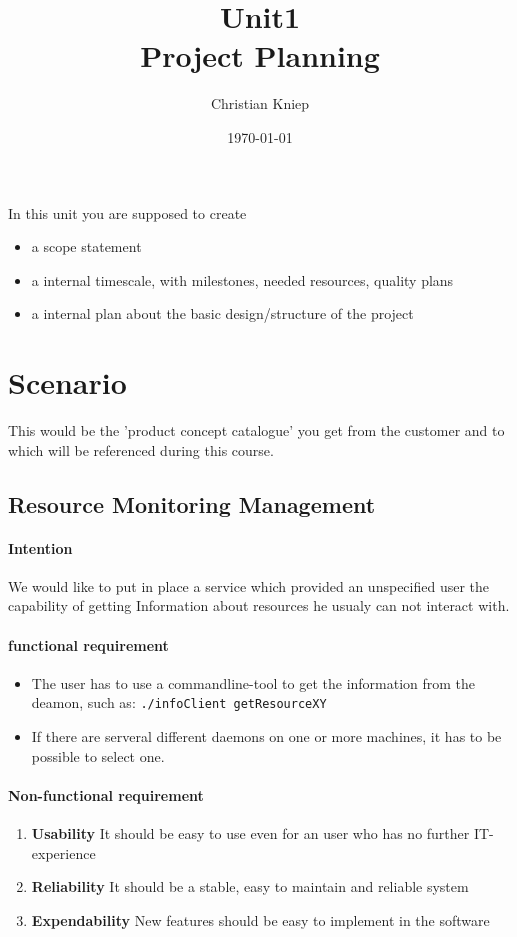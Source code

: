\documentclass[11pt]{article}
\author{Christian Kniep}
\title{Unit1 \\ Project Planning}
\date{\today}
\newcommand{\code}[1]{\colorbox{lGray}{\texttt{#1}}}
\begin{document}
\maketitle
In this unit you are supposed to create 
\begin{itemize}
    \item a scope statement 
    \item a internal timescale, with milestones, needed resources, quality plans
    \item a internal plan about the basic design/structure of the project
\end{itemize}

\tableofcontents

\newpage
\section{Scenario}
This would be the 'product concept catalogue' you get from the customer and to which will be referenced during this course.
\subsection{Resource Monitoring Management}
\paragraph{Intention}
We would like to put in place a service which provided an unspecified user
the capability of getting Information about resources he usualy can not interact with.
\paragraph{functional requirement}
\begin{itemize}
    \item The user has to use a commandline-tool to get the information from the deamon,
          such as: \code{./infoClient getResourceXY}
    \item If there are serveral different daemons on one or more machines,
          it has to be possible to select one.
\end{itemize}

\paragraph{Non-functional requirement}
\begin{enumerate}
    \item \textbf{Usability} It should be easy to use even for an user who has no further IT-experience
    \item \textbf{Reliability} It should be a stable, easy to maintain and reliable system
    \item \textbf{Expendability} New features should be easy to implement in the software 
\end{enumerate}
\end{document}
